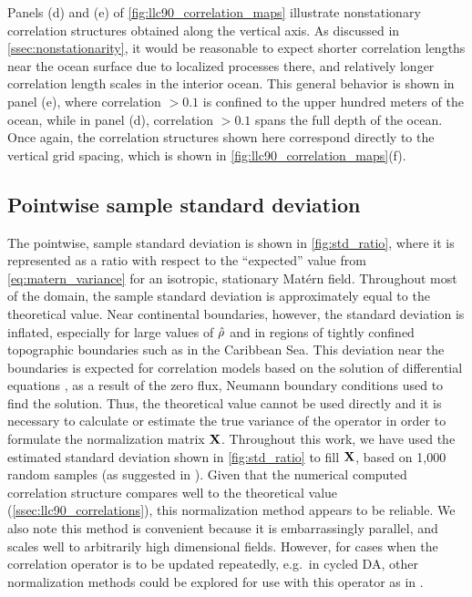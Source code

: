 Panels (d) and (e) of \cref{fig:llc90_correlation_maps}
illustrate nonstationary correlation structures obtained along the vertical axis.
As discussed in \cref{ssec:nonstationarity}, it would be reasonable to expect
shorter correlation lengths near the ocean surface due to localized processes
there, and relatively longer correlation length scales in the interior
ocean.
This general behavior is shown in panel (e), where correlation $>0.1$ is
confined to the upper hundred meters of the ocean, while in panel (d),
correlation $>0.1$ spans the full depth of the ocean.
Once again, the correlation structures shown here correspond directly to the
vertical grid spacing, which is shown in \cref{fig:llc90_correlation_maps}(f).


\subsection{Pointwise sample standard deviation}
\label{ssec:llc90_boundary_effects}


The pointwise, sample standard deviation is shown in \cref{fig:std_ratio}, where
it is represented as a ratio with respect to the ``expected'' value from
\cref{eq:matern_variance} for an isotropic, stationary Mat\'ern field.
Throughout most of the domain, the sample standard deviation is approximately
equal to the theoretical value.
Near continental boundaries, however, the standard deviation is inflated, especially
for large values of $\hat{\rho}$ and in regions of tightly confined topographic
boundaries such as in the Caribbean Sea.
This deviation near the boundaries is expected for correlation models based on
the solution of differential equations
\citep[e.g.][]{weaver_correlation_2001,RSSB:RSSB777}, as a result of the zero
flux, Neumann boundary conditions used to find the solution.
Thus, the theoretical value cannot be used directly and it is necessary to
calculate or estimate the true variance of the operator in order to formulate
the normalization matrix $\mathbf{X}$.
Throughout this work, we have used the estimated standard deviation shown in
\cref{fig:std_ratio} to fill $\mathbf{X}$, based on 1,000 random samples
(as suggested in \citet{weaver_correlation_2001}).
Given that the numerical computed correlation structure compares well to the
theoretical value (\cref{ssec:llc90_correlations}), this normalization method
appears to be reliable.
We also note this method is convenient because it is embarrassingly parallel,
and scales well to arbitrarily high dimensional fields.
However, for cases when the correlation operator is to be updated repeatedly,
e.g.\ in cycled DA, other normalization methods could be explored for use with
this operator as in \citet{weaver_evaluation_2021}.

